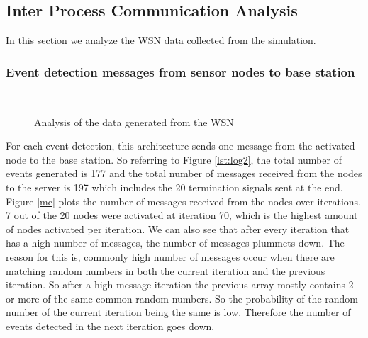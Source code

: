 \documentclass[conference]{IEEEtran}
\begin{document}
	\subsection{Inter Process Communication Analysis} \label{comm}
	
	In this section we analyze the WSN data collected from the simulation.

	\subsubsection{Event detection messages from sensor nodes to base station} \label{ob}
	
		\begin{figure}[!h]
		\centering
		\caption{Analysis of the data generated from the WSN}
		\\
	\end{figure}	

	 For each event detection, this architecture sends one message from the activated node to the base station. So referring to Figure \ref{lst:log2}, the total number of events generated is 177 and the total number of messages received from the nodes to the server is 197 which includes the 20 termination signals sent at the end. Figure \ref{me} plots the number of messages received from the nodes over iterations. 7 out of the 20 nodes were activated at iteration 70, which is the highest amount of nodes activated per iteration. We can also see that after every iteration that has a high number of messages, the number of messages plummets down. The reason for this is, commonly high number of messages occur when there are matching random numbers in both the current iteration and the previous iteration. So after a high message iteration the previous array mostly contains 2 or more of the same common random numbers. So the probability of the random number of the current iteration being the same is low. Therefore the number of events detected in the next iteration goes down.
	 
\end{document}
